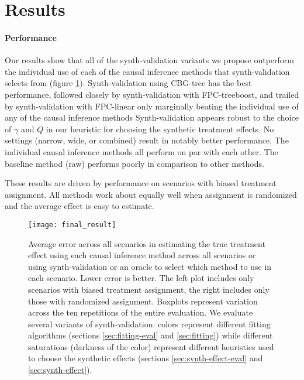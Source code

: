 \section{Results}
\label{sec:results}

\paragraph{Performance} Our results show that all of the synth-validation variants we propose outperform the individual use of each of the causal inference methods that synth-validation selects from (figure \ref{fig:result}). Synth-validation using CBG-tree has the best performance, followed closely by synth-validation with FPC-treeboost,
and trailed by synth-validation with FPC-linear
only marginally beating the individual use of any of the causal inference methods
Synth-validation appears robust to the choice of $\gamma$ and $Q$ in our heuristic for choosing the synthetic treatment effects. No settings (narrow, wide, or combined) result in notably better performance.
The individual causal inference methods all perform on par with each other. The baseline method (raw) performs poorly in comparison to other methods.

These results are driven by performance on scenarios with biased treatment assignment. All methods work about equally well when assignment is randomized and the average effect is easy to estimate.

\begin{figure}[h!]
\centering
\texttt{[image: final\_result]} 
\caption{Average error across all scenarios in estimating the true treatment effect using each causal inference method across all scenarios or using synth-validation or an oracle to select which method to use in each scenario. Lower error is better. The left plot includes only scenarios with biased treatment assignment, the right includes only those with randomized assignment. Boxplots represent variation across the ten repetitions of the entire evaluation. We evaluate several variants of synth-validation: colors represent different fitting algorithms (sections \ref{sec:fitting-eval} and \ref{sec:fitting}) while different saturations (darkness of the color) represent different heuristics used to choose the synthetic effects (sections  \ref{sec:synth-effect-eval} and \ref{sec:synth-effect}).}
\label{fig:result}
\end{figure}

